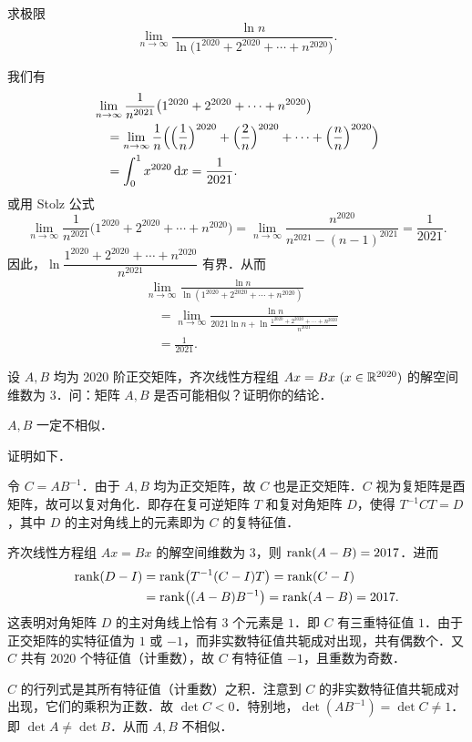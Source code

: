 求极限
\[
  \lim_{n\to\infty}\frac{\ln n}{\ln\bigl(1^{2020}+2^{2020}+\cdots+n^{2020}\bigr)}.
\]
\begin{solution}
我们有
\begin{align*}
&\lim_{n\to\infty}\frac{1}{n^{2021}}\bigl(1^{2020}+2^{2020}+\cdots+n^{2020}\bigr)\\
&\quad=\lim_{n\to\infty}\frac{1}{n}\Bigl(\Bigl(\frac{1}{n}\Bigr)^{2020}+\Bigl(\frac{2}{n}\Bigr)^{2020}+\cdots+\Bigl(\frac{n}{n}\Bigr)^{2020}\Bigr)\\
&\quad=\int_0^1 x^{2020}\,\mathrm{d} x=\frac{1}{2021}.
\end{align*}
或用 Stolz 公式
\[
  \lim_{n\to\infty}\frac{1}{n^{2021}}\bigl(1^{2020}+2^{2020}+\cdots+n^{2020}\bigr)
  =\lim_{n\to\infty}\frac{n^{2020}}{n^{2021}-(n-1)^{2021}}=\frac{1}{2021}.
\]
因此，$\ln\dfrac{1^{2020}+2^{2020}+\cdots+n^{2020}}{n^{2021}}$ 有界．从而
\begin{align*}
&\lim_{n\to\infty}\frac{\ln n}{\ln(1^{2020}+2^{2020}+\cdots+n^{2020})}\\
&\quad=\lim_{n\to\infty}\frac{\ln n}{2021\ln n+\ln\frac{1^{2020}+2^{2020}+\cdots+n^{2020}}{n^{2021}}}\\
&\quad=\frac{1}{2021}.
\end{align*}
\end{solution}

设 $A,B$ 均为 2020 阶正交矩阵，齐次线性方程组 $Ax=Bx\ (x\in\R^{2020})$ 的解空间维数为 $3$．问：矩阵 $A,B$ 是否可能相似？证明你的结论．
\begin{solution}
$A,B$ 一定不相似．

证明如下．

令 $C=AB^{-1}$．由于 $A,B$ 均为正交矩阵，故 $C$ 也是正交矩阵．$C$ 视为复矩阵是酉矩阵，故可以复对角化．即存在复可逆矩阵 $T$ 和复对角矩阵 $D$，使得 $T^{-1}CT=D$，其中 $D$ 的主对角线上的元素即为 $C$ 的复特征值．

齐次线性方程组 $Ax=Bx$ 的解空间维数为 $3$，则 $\operatorname{rank}(A-B)=2017$．进而
\begin{align*}
\operatorname{rank}(D-I)&=\operatorname{rank}\bigl(T^{-1}(C-I)T\bigr)=\operatorname{rank}(C-I)\\
&=\operatorname{rank}\bigl((A-B)B^{-1}\bigr)=\operatorname{rank}(A-B)=2017.
\end{align*}
这表明对角矩阵 $D$ 的主对角线上恰有 $3$ 个元素是 $1$．即 $C$ 有三重特征值 $1$．由于正交矩阵的实特征值为 $1$ 或 $-1$，而非实数特征值共轭成对出现，共有偶数个．又 $C$ 共有 $2020$ 个特征值（计重数），故 $C$ 有特征值 $-1$，且重数为奇数．

$C$ 的行列式是其所有特征值（计重数）之积．注意到 $C$ 的非实数特征值共轭成对出现，它们的乘积为正数．故 $\det C<0$．特别地，$\det(AB^{-1})=\det C\neq 1$．即 $\det A\neq\det B$．从而 $A,B$ 不相似．
\end{solution}

